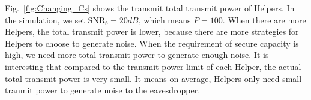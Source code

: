 \documentclass[conference]{IEEEtran}
\begin{document}
Fig.~\ref{fig:Changing_Cs} shows the transmit total transmit power of Helpers. In the simulation, we set $\mathrm{SNR}_b = 20 dB$, which means $P = 100$. When there are more Helpers, the total transmit power is lower, because there are more strategies for Helpers to choose to generate noise. When the requirement of secure capacity is high, we need more total transmit power to generate enough noise. It is interesting that compared to the transmit power limit of each Helper, the actual total transmit power is very small. It means on average, Helpers only need small tranmit power to generate noise to the eavesdropper.






%
%



%
%
\end{document}
